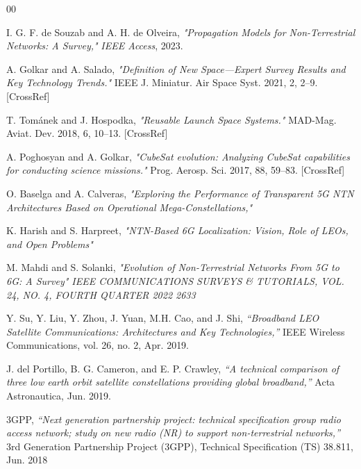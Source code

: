 \documentclass[conference]{IEEEtran}
\begin{document}
\begin{thebibliography}{00}

 I. G. F. de Souzab and A. H. de Olveira, \textit{"Propagation Models for Non-Terrestrial Networks: A Survey,"} \textit{IEEE Access}, 2023.

 A. Golkar and  A. Salado, \textit{ "Definition of New Space—Expert Survey Results and Key Technology Trends."} IEEE J. Miniatur. Air Space Syst. 2021, 2, 2–9. [CrossRef]

 T. Tománek and J. Hospodka, \textit{"Reusable Launch Space Systems."}  MAD-Mag. Aviat. Dev. 2018, 6, 10–13. [CrossRef]

  A. Poghosyan and A. Golkar, \textit{"CubeSat evolution: Analyzing CubeSat capabilities for conducting science missions."} Prog. Aerosp. Sci. 2017, 88, 59–83. [CrossRef]

 O. Baselga and A. Calveras, \textit{"Exploring the Performance of Transparent 5G NTN Architectures Based on Operational Mega-Constellations,"} %

 K. Harish and S. Harpreet, \textit{"NTN-Based 6G Localization: Vision, Role of LEOs, and Open Problems"} %

 M. Mahdi and S. Solanki, \textit{ "Evolution of Non-Terrestrial Networks From 5G to 6G: A Survey" IEEE COMMUNICATIONS SURVEYS \& TUTORIALS, VOL. 24, NO. 4, FOURTH QUARTER 2022 2633}

 Y. Su, Y. Liu, Y. Zhou, J. Yuan, M.H. Cao, and J. Shi, \textit{ “Broadband LEO Satellite Communications: Architectures and Key Technologies,”} IEEE Wireless Communications, vol. 26, no. 2, Apr. 2019.

 J. del Portillo, B. G. Cameron, and E. P. Crawley, \textit{“A technical comparison of three low earth orbit satellite constellations providing global broadband,” } Acta Astronautica, Jun. 2019.

 3GPP, \textit{“Next generation partnership project: technical specification group radio access network; study on new radio (NR) to support non-terrestrial networks,”}  3rd Generation Partnership Project (3GPP), Technical Specification (TS) 38.811, Jun. 2018


\end{thebibliography}
\end{document}

